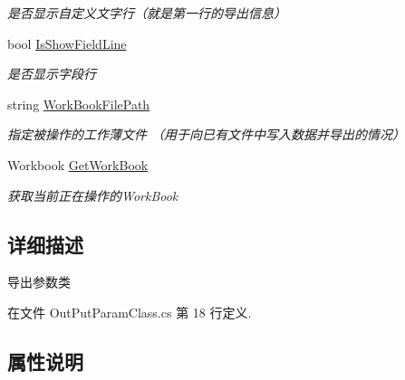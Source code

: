 \begin{DoxyCompactItemize}
\begin{DoxyCompactList}\small\item\em 是否显示自定义文字行（就是第一行的导出信息） \end{DoxyCompactList}\item 
bool \hyperlink{class_x_c_l_net_tools_1_1_entity_1_1_office_1_1_excel_handler_1_1_out_put_param_class_a6003391938fd21744be4f6bb16cf89d9}{Is\+Show\+Field\+Line}
\begin{DoxyCompactList}\small\item\em 是否显示字段行 \end{DoxyCompactList}\item 
string \hyperlink{class_x_c_l_net_tools_1_1_entity_1_1_office_1_1_excel_handler_1_1_out_put_param_class_a5b29724ec341728c000b509ec1a5e5bc}{Work\+Book\+File\+Path}
\begin{DoxyCompactList}\small\item\em 指定被操作的工作薄文件 （用于向已有文件中写入数据并导出的情况） \end{DoxyCompactList}\item 
Workbook \hyperlink{class_x_c_l_net_tools_1_1_entity_1_1_office_1_1_excel_handler_1_1_out_put_param_class_a953f3019c51e0fff8f6ec14dbe3cc10d}{Get\+Work\+Book}
\begin{DoxyCompactList}\small\item\em 获取当前正在操作的\+Work\+Book \end{DoxyCompactList}\end{DoxyCompactItemize}


\subsection{详细描述}
导出参数类 



在文件 Out\+Put\+Param\+Class.\+cs 第 18 行定义.



\subsection{属性说明}
